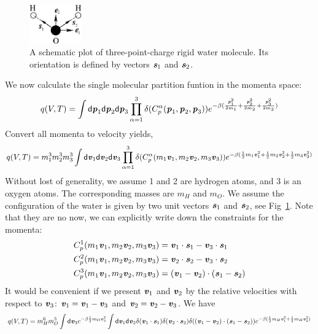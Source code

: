 \documentclass[aip,jcp,a4paper,reprint,onecolumn]{revtex4-1}
\newcommand{\vect}[1]{\textbf{\textit{#1}}}
\newcommand{\dd}[0]{\textsf{d}}
\begin{document}
\begin{figure}
  \centering
  \includegraphics[width=0.2\textwidth]{fig/water.eps}
  \caption{A schematic plot of three-point-charge rigid water molecule.
  Its orientation is defined by vectors $\vect s_1$ and $\vect s_2$.}
  \label{fig:tmp1}
\end{figure}

We now calculate the single molecular partition funtion in the momenta space:
\begin{align}
  q(V,T) =
  \int \dd\vect p_1\dd\vect p_2\dd\vect p_3
  \prod_{\alpha=1}^3
  \delta (C_p^\alpha (\vect p_1,\vect p_2,\vect p_3))
  e^{-\beta (\frac{\vect p_1^2}{2 m_1} + \frac{\vect p_2^2}{2 m_2} + \frac{\vect p_3^2}{2 m_3})}
\end{align}
Convert all momenta to velocity yields,
\begin{align}
  q(V,T) =
  m^3_1 m^3_2 m^3_3 \int \dd\vect v_1\dd\vect v_2\dd\vect v_3
  \prod_{\alpha=1}^3
  \delta (C_p^\alpha (m_1\vect v_1,m_2\vect v_2,m_3\vect v_3))
  e^{-\beta (\frac12m_1\vect v_1^2 + \frac12m_2\vect v_2^2 + \frac12m_3\vect v_3^2)}
\end{align}
Without lost of generality, we assume 1 and 2 are hydrogen atoms, and 3 is an oxygen atoms. The corresponding masses are $m_H$ and $m_O$.
We assume the configuration of the water is given by two unit vectors $\vect s_1$ and
$\vect s_2$, see Fig~\ref{fig:tmp1}. Note that they are no
now, we can explicitly write down the constraints for the momenta:
\begin{align}
  C_p^1 (m_1\vect v_1,m_2\vect v_2,m_3\vect v_3)
  &= \vect v_1\cdot\vect s_1 - \vect v_3\cdot\vect s_1\\
  C_p^2 (m_1\vect v_1,m_2\vect v_2,m_3\vect v_3)
  &= \vect v_2\cdot\vect s_2 - \vect v_3\cdot\vect s_2\\
  C_p^3 (m_1\vect v_1,m_2\vect v_2,m_3\vect v_3)
  &= (\vect v_1 - \vect v_2)\cdot(\vect s_1 - \vect s_2)
\end{align}
It would be convenient if we present $\vect v_1$ and $\vect v_2$
by the relative velocities with respect to $\vect v_3$:
$\vect v_1 = \vect v_1 - \vect v_3$ and 
$\vect v_2 = \vect v_2 - \vect v_3$. We have
\begin{align}
  q(V,T) =
  m_H^6m_O^3
  \int \dd\vect v_3
  e^{-\beta \frac12m_O\vect v_3^2}
  \int \dd\vect v_1\dd\vect v_2
  \delta(\vect v_1\cdot\vect s_1)
  \delta(\vect v_2\cdot\vect s_2)
  \delta((\vect v_1 - \vect v_2)\cdot(\vect s_1 - \vect s_2))
  e^{-\beta (\frac12m_H\vect v_1^2 + \frac12m_H\vect v_2^2)}
\end{align}
\end{document}
